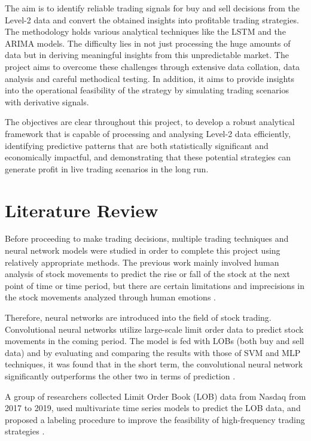 \documentclass[conference]{IEEEtran}
\begin{document}
The aim is to identify reliable trading signals for buy and sell decisions from the Level-2 data and convert the obtained insights into profitable trading strategies. The methodology holds various analytical techniques like the LSTM and the ARIMA models. The difficulty lies in not just processing the huge amounts of data but in deriving meaningful insights from this unpredictable market. The project aims to overcome these challenges through extensive data collation, data analysis and careful methodical testing. In addition, it aims to provide insights into the operational feasibility of the strategy by simulating trading scenarios with derivative signals.

The objectives are clear throughout this project, to develop a robust analytical framework that is capable of processing and analysing Level-2 data efficiently, identifying predictive patterns that are both statistically significant and economically impactful, and demonstrating that these potential strategies can generate profit in live trading scenarios in the long run.

\section{Literature Review}
Before proceeding to make trading decisions, multiple trading techniques and neural network models were studied in order to complete this project using relatively appropriate methods. The previous work mainly involved human analysis of stock movements to predict the rise or fall of the stock at the next point of time or time period, but there are certain limitations and imprecisions in the stock movements analyzed through human emotions \cite{b1}. 

Therefore, neural networks are introduced into the field of stock trading. Convolutional neural networks utilize large-scale limit order data to predict stock movements in the coming period. The model is fed with LOBs (both buy and sell data) and by evaluating and comparing the results with those of SVM and MLP techniques, it was found that in the short term, the convolutional neural network significantly outperforms the other two in terms of prediction \cite{b2}. 

A group of researchers collected Limit Order Book (LOB) data from Nasdaq from 2017 to 2019, used multivariate time series models to predict the LOB data, and proposed a labeling procedure to improve the feasibility of high-frequency trading strategies \cite{b11}.
\end{document}
